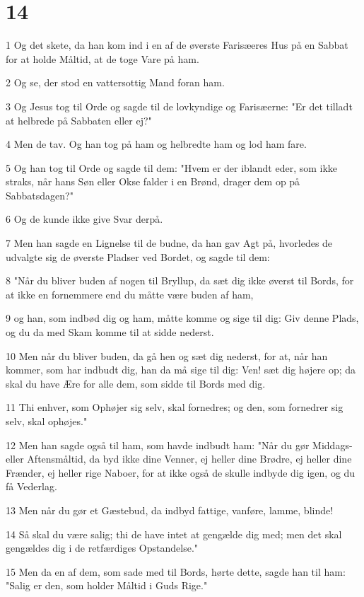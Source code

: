 \chapter{14}

\par 1 Og det skete, da han kom ind i en af de øverste Farisæeres Hus på en Sabbat for at holde Måltid, at de toge Vare på ham.
\par 2 Og se, der stod en vattersottig Mand foran ham.
\par 3 Og Jesus tog til Orde og sagde til de lovkyndige og Farisæerne: "Er det tilladt at helbrede på Sabbaten eller ej?"
\par 4 Men de tav. Og han tog på ham og helbredte ham og lod ham fare.
\par 5 Og han tog til Orde og sagde til dem: "Hvem er der iblandt eder, som ikke straks, når hans Søn eller Okse falder i en Brønd, drager dem op på Sabbatsdagen?"
\par 6 Og de kunde ikke give Svar derpå.
\par 7 Men han sagde en Lignelse til de budne, da han gav Agt på, hvorledes de udvalgte sig de øverste Pladser ved Bordet, og sagde til dem:
\par 8 "Når du bliver buden af nogen til Bryllup, da sæt dig ikke øverst til Bords, for at ikke en fornemmere end du måtte være buden af ham,
\par 9 og han, som indbød dig og ham, måtte komme og sige til dig: Giv denne Plads, og du da med Skam komme til at sidde nederst.
\par 10 Men når du bliver buden, da gå hen og sæt dig nederst, for at, når han kommer, som har indbudt dig, han da må sige til dig: Ven! sæt dig højere op; da skal du have Ære for alle dem, som sidde til Bords med dig.
\par 11 Thi enhver, som Ophøjer sig selv, skal fornedres; og den, som fornedrer sig selv, skal ophøjes."
\par 12 Men han sagde også til ham, som havde indbudt ham: "Når du gør Middags- eller Aftensmåltid, da byd ikke dine Venner, ej heller dine Brødre, ej heller dine Frænder, ej heller rige Naboer, for at ikke også de skulle indbyde dig igen, og du få Vederlag.
\par 13 Men når du gør et Gæstebud, da indbyd fattige, vanføre, lamme, blinde!
\par 14 Så skal du være salig; thi de have intet at gengælde dig med; men det skal gengældes dig i de retfærdiges Opstandelse."
\par 15 Men da en af dem, som sade med til Bords, hørte dette, sagde han til ham: "Salig er den, som holder Måltid i Guds Rige."
